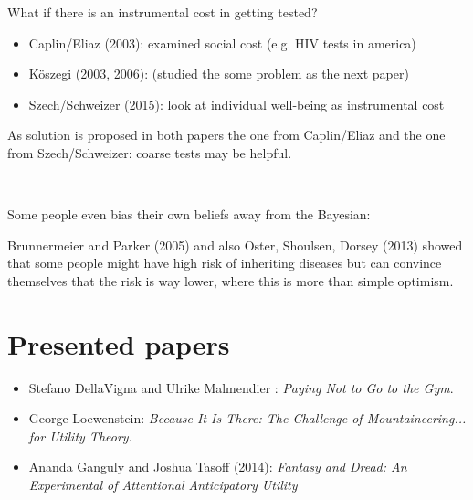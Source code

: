 What if there is an instrumental cost in getting tested?
\begin{itemize}
	\item Caplin/Eliaz (2003): examined social cost (e.g. HIV tests in america)
	\item Köszegi (2003, 2006): (studied the some problem as the next paper)
	\item Szech/Schweizer (2015): look at individual well-being as instrumental cost
\end{itemize}

As solution is proposed in both papers the one from Caplin/Eliaz and the one from Szech/Schweizer: coarse tests may be helpful.

~\newline

Some people even bias their own beliefs away from the Bayesian:
 
Brunnermeier and Parker (2005) and also Oster, Shoulsen, Dorsey (2013) showed that some people might have high risk of inheriting diseases but can convince themselves that the risk is way lower, where this is more than simple optimism.

\section{Presented papers}

\begin{itemize}
	\item Stefano DellaVigna and Ulrike Malmendier : \textit{Paying Not to Go to the Gym}.
	\item George Loewenstein: \textit{Because It Is There: The Challenge of Mountaineering... for Utility Theory}.
	\item Ananda Ganguly and Joshua Tasoff (2014): \textit{Fantasy and Dread: An Experimental of Attentional Anticipatory Utility}
\end{itemize}


\newpage